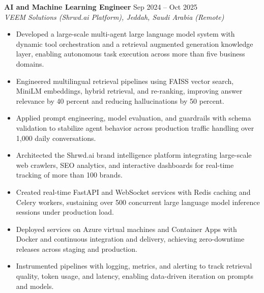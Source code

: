 \documentclass[10pt,letterpaper]{article}
\begin{document}
\textbf{AI and Machine Learning Engineer} \hfill Sep 2024 -- Oct 2025\\
\textit{VEEM Solutions (Shrwd.ai Platform), Jeddah, Saudi Arabia (Remote)}
\begin{itemize}
\item Developed a large-scale multi-agent large language model system with dynamic tool orchestration and a retrieval augmented generation knowledge layer, enabling autonomous task execution across more than five business domains.
\item Engineered multilingual retrieval pipelines using FAISS vector search, MiniLM embeddings, hybrid retrieval, and re-ranking, improving answer relevance by 40 percent and reducing hallucinations by 50 percent.
\item Applied prompt engineering, model evaluation, and guardrails with schema validation to stabilize agent behavior across production traffic handling over 1,000 daily conversations.
\item Architected the Shrwd.ai brand intelligence platform integrating large-scale web crawlers, SEO analytics, and interactive dashboards for real-time tracking of more than 100 brands.
\item Created real-time FastAPI and WebSocket services with Redis caching and Celery workers, sustaining over 500 concurrent large language model inference sessions under production load.
\item Deployed services on Azure virtual machines and Container Apps with Docker and continuous integration and delivery, achieving zero-downtime releases across staging and production.
\item Instrumented pipelines with logging, metrics, and alerting to track retrieval quality, token usage, and latency, enabling data-driven iteration on prompts and models.
\end{itemize}
\end{document}
